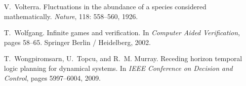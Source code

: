 \documentclass{ifacconf}
\begin{document}
\begin{thebibliography}{21}
V.~Volterra.
\newblock Fluctuations in the abundance of a species considered mathematically.
\newblock \emph{Nature}, 118: 558--560, 1926.

T.~Wolfgang.
\newblock Infinite games and verification.
\newblock In \emph{Computer Aided Verification}, pages 58--65. Springer Berlin
  / Heidelberg, 2002.

T.~Wongpiromsarn, U.~Topcu, and R.~M. Murray.
\newblock Receding horizon temporal logic planning for dynamical systems.
\newblock In \emph{{IEEE} Conference on Decision and Control}, pages
  5997--6004, 2009.

\end{thebibliography}
\end{document}

